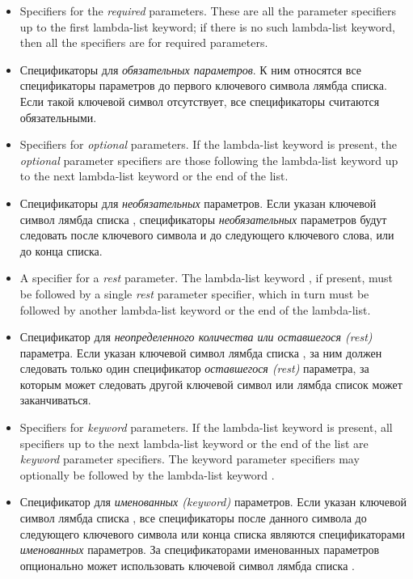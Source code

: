 \begin{itemize}
\item
Specifiers for the \textit{required} parameters.  These are all the parameter
specifiers up to the first lambda-list keyword; if there is no such
lambda-list keyword, then all the specifiers are for required parameters.

\item
Спецификаторы для \textit{обязательных параметров}. К ним относятся все
спецификаторы параметров до первого ключевого символа лямбда списка. Если такой
ключевой символ отсутствует, все спецификаторы считаются обязательными.

\item
Specifiers for \textit{optional} parameters.
If the lambda-list keyword  is present,
the \textit{optional} parameter specifiers are those following the
lambda-list keyword  up to the next lambda-list keyword or the
end of the list.

\item
Спецификаторы для \textit{необязательных} параметров.
Если указан ключевой символ лямбда списка , спецификаторы
\textit{необязательных} параметров будут следовать после ключевого символа
 и до следующего ключевого слова, или до конца списка.

\item
A specifier for a \textit{rest} parameter.  The lambda-list keyword , if present, must
be followed by a single \textit{rest} parameter specifier,
which in turn must be followed by another lambda-list keyword or the end
of the lambda-list.

\item
Спецификатор для \textit{неопределенного количества или оставшегося (rest)} параметра. Если указан ключевой символ
лямбда списка , за ним должен следовать только один спецификатор
\textit{оставшегося (rest)} параметра, за которым может следовать другой ключевой символ или
лямбда список может заканчиваться.

\item
Specifiers for \textit{keyword} parameters.
If the lambda-list keyword  is present, all specifiers up to the next lambda-list keyword
or the end of the list are \textit{keyword} parameter specifiers.
The keyword parameter specifiers may optionally be followed by the
lambda-list keyword .

\item
Спецификатор для \textit{именованных (keyword)} параметров. Если указан ключевой
символ лямбда списка , все спецификаторы после данного символа до
следующего ключевого символа или конца списка являются спецификаторами
\textit{именованных} параметров. За спецификаторами именованных параметров
опционально может использовать ключевой символ лямбда списка .


\end{itemize}
